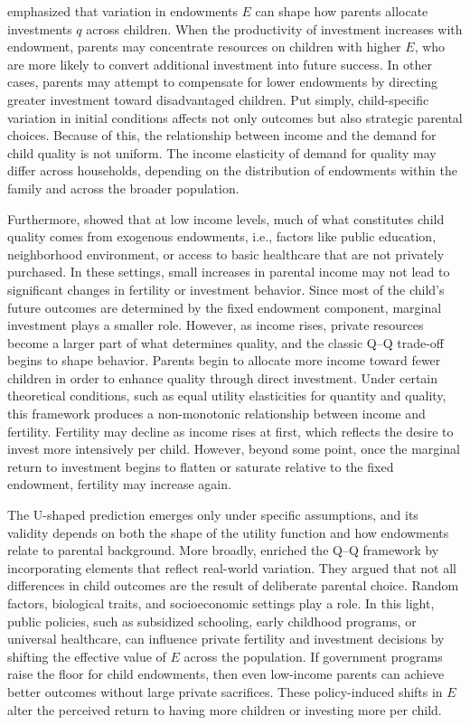 \documentclass[]{AEA}
\begin{document}
\citet{becker1976child} emphasized that variation in endowments \(E\)
can shape how parents allocate investments \(q\) across children. When
the productivity of investment increases with endowment, parents may
concentrate resources on children with higher \(E\), who are more likely
to convert additional investment into future success. In other cases,
parents may attempt to compensate for lower endowments by directing
greater investment toward disadvantaged children. Put simply,
child-specific variation in initial conditions affects not only outcomes
but also strategic parental choices. Because of this, the relationship
between income and the demand for child quality is not uniform. The
income elasticity of demand for quality may differ across households,
depending on the distribution of endowments within the family and across
the broader population.

Furthermore, \citet{becker1976child} showed that at low income levels,
much of what constitutes child quality comes from exogenous endowments,
i.e., factors like public education, neighborhood environment, or access
to basic healthcare that are not privately purchased. In these settings,
small increases in parental income may not lead to significant changes
in fertility or investment behavior. Since most of the child's future
outcomes are determined by the fixed endowment component, marginal
investment plays a smaller role. However, as income rises, private
resources become a larger part of what determines quality, and the
classic Q--Q trade-off begins to shape behavior. Parents begin to
allocate more income toward fewer children in order to enhance quality
through direct investment. Under certain theoretical conditions, such as
equal utility elasticities for quantity and quality, this framework
produces a non-monotonic relationship between income and fertility.
Fertility may decline as income rises at first, which reflects the
desire to invest more intensively per child. However, beyond some point,
once the marginal return to investment begins to flatten or saturate
relative to the fixed endowment, fertility may increase again.

The U-shaped prediction emerges only under specific assumptions, and its
validity depends on both the shape of the utility function and how
endowments relate to parental background. More broadly,
\citet{becker1976child} enriched the Q--Q framework by incorporating
elements that reflect real-world variation. They argued that not all
differences in child outcomes are the result of deliberate parental
choice. Random factors, biological traits, and socioeconomic settings
play a role. In this light, public policies, such as subsidized
schooling, early childhood programs, or universal healthcare, can
influence private fertility and investment decisions by shifting the
effective value of \(E\) across the population. If government programs
raise the floor for child endowments, then even low-income parents can
achieve better outcomes without large private sacrifices. These
policy-induced shifts in \(E\) alter the perceived return to having more
children or investing more per child.
\end{document}
